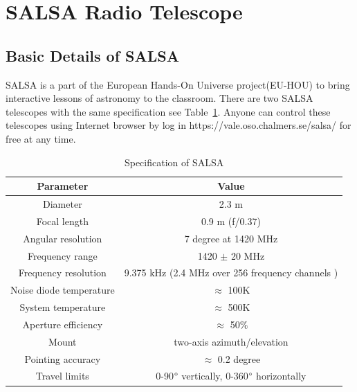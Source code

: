 \documentclass[conference]{IEEEtran}
\begin{document}
\section{SALSA Radio Telescope}

\subsection{Basic Details of SALSA}

SALSA is a part of the European Hands-On Universe project(EU-HOU)\cite{Ferlet2006} to bring interactive lessons of astronomy to the classroom\cite{SALSAS2018}. There are two SALSA telescopes with the same specification see Table~\ref{Tab:salsa_specification}\cite{ThomasBensby2017}. Anyone can control these telescopes using Internet browser by log in https://vale.oso.chalmers.se/salsa/ for free at any time. 


\begin{table}[htbp]
\caption{Specification of SALSA}
\begin{center}
\begin{tabular}{|c|c|}
\hline
\textbf{Parameter}&\multicolumn{1}{|c|}{\textbf{Value}} \\
\cline{1-2} 
\hline
Diameter & 2.3 m\\
\hline
Focal length & 0.9 m (f/0.37)\\
\hline
Angular resolution & 7 degree at 1420 MHz\\
\hline
Frequency range & 1420 $\pm$ 20 MHz\\
\hline
Frequency resolution & 9.375 kHz (2.4 MHz over 256 frequency channels )\\
\hline
Noise diode temperature & $\approx$ 100K\\
\hline
System temperature & $\approx$ 500K\\
\hline
Aperture efficiency & $\approx$ 50$\%$\\
\hline
Mount & two-axis azimuth/elevation\\
\hline
Pointing accuracy & $\approx$ 0.2 degree\\
\hline
Travel limits &  0-90$\degree$ vertically, 0-360$\degree$ horizontally\\
\hline
\end{tabular}
\label{Tab:salsa_specification}
\end{center}
\end{table}
\end{document}
